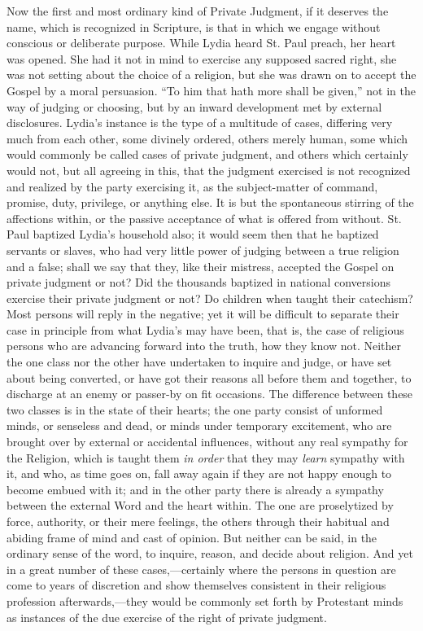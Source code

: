Now the first and most ordinary kind of Private Judgment, if it
deserves the name, which is recognized in Scripture, is that in which
we engage without conscious or deliberate purpose. While Lydia heard
St. Paul preach, her heart was opened. She had it not in mind to
exercise any supposed sacred right, she was not setting about the
choice of a religion, but she was drawn on to accept the Gospel by a
moral persuasion. ``To him that hath more shall be given,''
not in the way of judging or choosing, but by an inward development
met by external disclosures. Lydia's instance is the type of a
multitude of cases, differing very much from each other, some divinely
ordered, others merely human, some which would commonly be called
cases of private judgment, and others which certainly would not, but
all agreeing in this, that the judgment exercised is not recognized
and realized by the party exercising it, as the subject-matter of
command, promise, duty, privilege, or anything else. It is but the
spontaneous stirring of the affections within, or the passive
acceptance of what is offered from without. St. Paul baptized Lydia's
household also; it would seem then that he baptized servants or
slaves, who had very little power of judging between a true religion
and a false; shall we say that they, like their mistress, accepted the
Gospel on private judgment or not? Did the thousands baptized in
national conversions exercise their private judgment or not? Do
children when taught their catechism? Most persons will reply in the
negative; yet it will be difficult to separate their case in principle
from what Lydia's may have been, that is, the case of religious
persons who are advancing forward into the truth, how they know not.
Neither the one class nor the other have undertaken to inquire and
judge, or have set about being converted, or have got their reasons
all before them and together, to discharge at an enemy or passer-by on
fit occasions. The difference between these two classes is in the
state of their hearts; the one party consist of unformed minds, or
senseless and dead, or minds under temporary excitement, who are
brought over by external or accidental influences, without any real
sympathy for the Religion, which is taught them \emph{in order} that
they may \emph{learn} sympathy with it, and who, as time goes on, fall
away again if they are not happy enough to become embued with it; and
in the other party there is already a sympathy between the external
Word and the heart within. The one are proselytized by force,
authority, or their mere feelings, the others through their habitual
and abiding frame of mind and cast of opinion. But neither can be
said, in the ordinary sense of the word, to inquire, reason, and
decide about religion. And yet in a great number of these cases,—certainly
where the persons in question are come to years of discretion and show
themselves consistent in their religious profession afterwards,—they
would be commonly set forth by Protestant minds as instances of the
due exercise of the right of private judgment.

